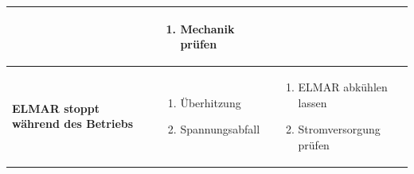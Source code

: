 \begin{table}[ht]
\begin{tabular}{|p{5cm}|p{5cm}|p{}|}
\begin{enumerate}
		\end{enumerate} &
		\vspace{-10pt}
		\begin{enumerate}
			\item Mechanik prüfen
			\vspace{5pt}
		\end{enumerate} \\ \hline
		\vspace{10pt}
		\centering
		\textbf{ELMAR stoppt während des Betriebs} &
		\vspace{-10pt}
		\begin{enumerate}
			\item Überhitzung
			\item Spannungsabfall
		\end{enumerate} &
		\vspace{-10pt}
		\begin{enumerate}
			\item ELMAR abkühlen lassen
			\item Stromversorgung prüfen
			\vspace{5pt}
		\end{enumerate} \\ \hline
		
	\end{tabular}
\end{table}





